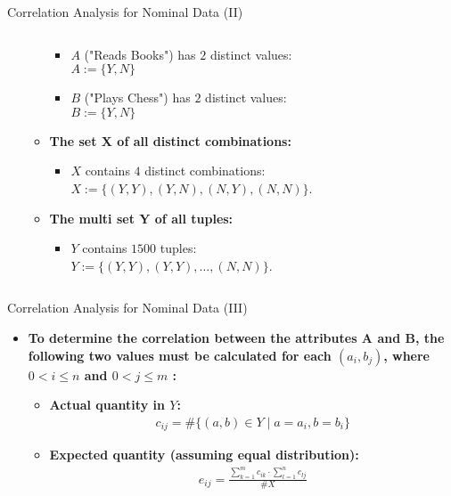 \begin{frame}{Correlation Analysis for Nominal Data (II)}
\begin{columns}
\begin{column}{0.5\textwidth}
\begin{itemize}
\begin{itemize}
					            \begin{itemize}
						            \item $A$ ("Reads Books") has $2$ distinct
						                  values: \\
						                  $A := \{Y, N\}$
						            \item $B$ ("Plays Chess") has $2$ distinct values: \\
						                  $B := \{Y, N\}$
					            \end{itemize}
					      \item \textbf{The set X of all distinct combinations:}
					            \begin{itemize}
						            \item $X$ contains $4$ distinct combinations: \\
						                  $X := \{(Y, Y), (Y, N), (N, Y), (N, N)\}$.
					            \end{itemize}
					      \item \textbf{The multi set Y of all tuples:}
					            \begin{itemize}
						            \item $Y$ contains $1500$ tuples: \\
						                  $Y := \{(Y, Y), (Y, Y), \ldots, (N, N)\}$.
					            \end{itemize}
				      \end{itemize}
			\end{itemize}
		\end{column}
	\end{columns}
\end{frame}

\begin{frame}{Correlation Analysis for Nominal Data (III)}

	\begin{itemize}
		\item \textbf{To determine the correlation between the attributes A and
			      B, the following two values must be calculated for each $(a_i,b_j)$,
			      where $0 < i \leq n$ and $0 < j \leq m$ :}
		      \begin{itemize}
			      \item \textbf{Actual quantity in $Y$:}
			            \begin{align*}
				            c_{ij} = \#\{(a,b) \in Y \; \vert \; a = a_i, b= b_i\}
			            \end{align*}
			      \item \textbf{Expected quantity (assuming equal distribution):}
			            \begin{align*}
				            e_{ij} = \frac{\sum_{k=1}^{m} c_{ik} \cdot
				            \sum_{l=1}^{n}c_{lj}}{\#X}
			            \end{align*}
		      \end{itemize}
	\end{itemize}
\end{frame}

